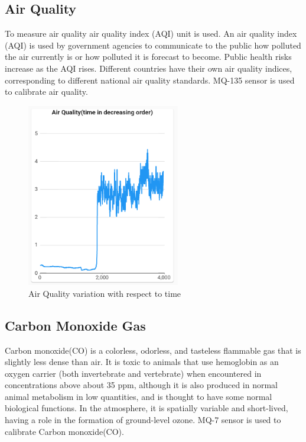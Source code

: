 \subsection{Air Quality}
To measure air quality air quality index (AQI) unit is used.
An air quality index (AQI) is used by government agencies to communicate to the public how polluted the air currently is or how polluted it is forecast to become. Public health risks increase as the AQI rises. Different countries have their own air quality indices, corresponding to different national air quality standards. MQ-135 sensor is used to calibrate air quality.
\begin{figure}[!ht]
\centering
\includegraphics[width=\linewidth,height=8cm]{figures/airquality.png}
\caption{\label{img48} Air Quality variation with respect to time}
\end{figure}

\subsection{Carbon Monoxide Gas}
Carbon monoxide(CO) is a colorless, odorless, and tasteless flammable gas that is slightly less dense than air. It is toxic to animals that use hemoglobin as an oxygen carrier (both invertebrate and vertebrate) when encountered in concentrations above about 35 ppm, although it is also produced in normal animal metabolism in low quantities, and is thought to have some normal biological functions. In the atmosphere, it is spatially variable and short-lived, having a role in the formation of ground-level ozone. MQ-7 sensor is used to calibrate Carbon monoxide(CO).

